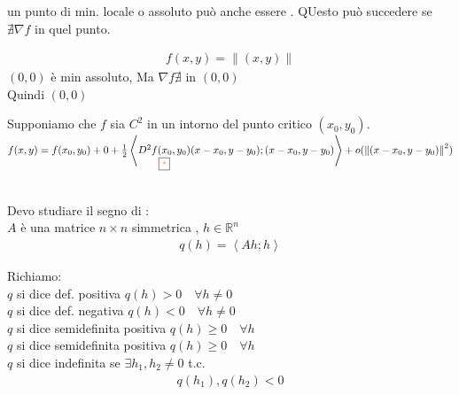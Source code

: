 \documentclass[a4paper, oneside]{article}
\begin{document}
        \begin{observation}
            un punto di min. locale o assoluto può anche essere . QUesto può succedere se $\nexists \nabla f$ in quel punto.\\
        \end{observation}
        \begin{example}
                \begin{gather*}
                    f(x,y) = \left\lVert (x,y) \right\rVert 
                \end{gather*}
                $(0,0)$ è min assoluto, Ma $\nabla f \nexists$ in $(0,0)$\\
                Quindi $(0,0)$ 
        \end{example}

        \begin{theorem}[di Taylor]
            Supponiamo che $f$ sia $C^2$ in un intorno del punto critico $(x_0,y_0)$.\\
            $f(x,y) = f(x_0,y_0) + 0 + \frac{1}{2} \left\langle \underset{\text{\fbox{\textcolor{orange}{*}}}}{D^2f(x_0,y_0)}(x-x_0,y-y_0);(x-x_0,y-y_0)\right\rangle + o(\left\lVert (x-x_0,y-y_0)\right\rVert^2 )$
        \end{theorem}
        \hfil\\
        Devo studiare il segno di \fbox{\textcolor{orange}{*}}:\\
         $A$ è una matrice $n\times n$ simmetrica , $h \in \mathbb{R}^n$
        \begin{gather*}
            q(h) = \left\langle Ah;h \right\rangle 
        \end{gather*}

        \begin{proposition}
            Richiamo:\\
            $q$ si dice def. positiva  $q(h) > 0 \quad \forall h \neq 0$\\
            $q$ si dice def. negativa  $q(h) < 0 \quad \forall h \neq 0$\\
            $q$ si dice semidefinita positiva  $q(h) \geq 0 \quad \forall h$\\
            $q$ si dice semidefinita positiva  $q(h) \geq 0 \quad \forall h$\\
            $q$ si dice indefinita se $\exists h_1,h_2 \neq 0$ t.c.
            \begin{gather*}
                q(h_1),q(h_2) < 0
            \end{gather*}
        \end{proposition}
\end{document}

